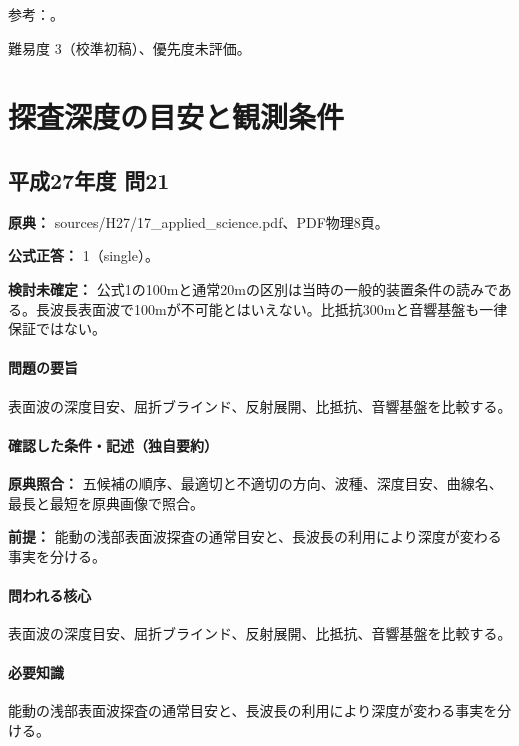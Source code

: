 \par 参考：\cite{epa_resistivity,epa_fdem,epa_borehole_resistivity}。

\par 難易度 3（校準初稿）、優先度未評価。

\section{探査深度の目安と観測条件}

\subsection{平成27年度 問21}
\label{q:h27-reg-applied-21}

\noindent\textbf{原典：} sources/H27/17\_applied\_science.pdf、PDF物理8頁。

\textbf{公式正答：} 1（single）。

\par\textbf{検討未確定：} 公式1の100mと通常20mの区別は当時の一般的装置条件の読みである。長波長表面波で100mが不可能とはいえない。比抵抗300mと音響基盤も一律保証ではない。

\paragraph{問題の要旨} 表面波の深度目安、屈折ブラインド、反射展開、比抵抗、音響基盤を比較する。

\paragraph{確認した条件・記述（独自要約）}\mbox{}\par

\noindent\textbf{原典照合：} 五候補の順序、最適切と不適切の方向、波種、深度目安、曲線名、最長と最短を原典画像で照合。\par

\noindent\textbf{前提：} 能動の浅部表面波探査の通常目安と、長波長の利用により深度が変わる事実を分ける。\par

\paragraph{問われる核心} 表面波の深度目安、屈折ブラインド、反射展開、比抵抗、音響基盤を比較する。

\paragraph{必要知識} 能動の浅部表面波探査の通常目安と、長波長の利用により深度が変わる事実を分ける。

